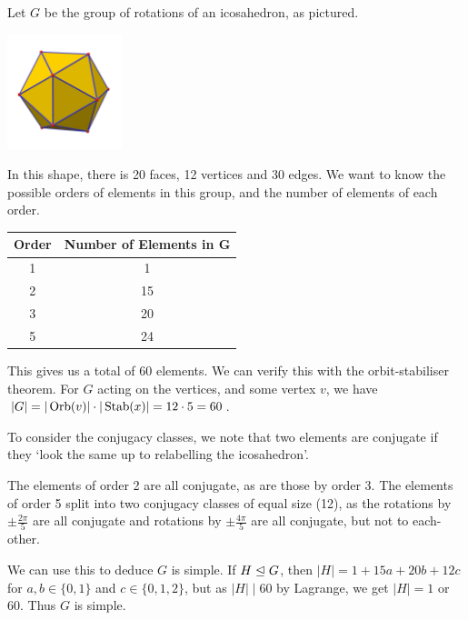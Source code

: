 \documentclass[a4paper]{scrartcl}
\begin{document}
\begin{example}
	Let $G$ be the group of rotations of an icosahedron, as pictured.
	\begin{center}
		\includegraphics[width=0.25\textwidth]{icosahedron.png}
	\end{center}

	In this shape, there is 20 faces, 12 vertices and 30 edges. We want to know the possible orders of elements in this group, and the number of elements of each order.
\begin{center}
	\begin{tabular}{@{}cc@{}}
		\toprule
		Order & Number of Elements in G   \\ \midrule
		1 	  & 1                         \\
		2	  & 15 \\
		3 	  & 20 \\
		5 	  & 24\\\bottomrule
		\end{tabular}
\end{center}
This gives us a total of $60$ elements. We can verify this with the orbit-stabiliser theorem. For $G$ acting on the vertices, and some vertex $v$, we have $|G| = |\operatorname{Orb}(v)| \cdot |\operatorname{Stab}(x)| = 12 \cdot 5 = 60$.

To consider the conjugacy classes, we note that two elements are conjugate if they `look the same up to relabelling the icosahedron'.

The elements of order 2 are all conjugate, as are those by order 3. The elements of order 5 split into two conjugacy classes of equal size (12), as the rotations by $\pm \frac{2 \pi}{5}$ are all conjugate and rotations by $\pm \frac{4 \pi}{5}$ are all conjugate, but not to each-other.

We can use this to deduce $G$ is simple. If $H \trianglelefteq G$, then $|H| = 1 + 15 a + 20b + 12c$ for $a, b \in \{0, 1\}$ and $c \in \{0, 1, 2\}$, but as $|H| \mid 60$ by Lagrange, we get $|H| = 1$ or 60. Thus $G$ is simple.


\end{example}
\end{document}
